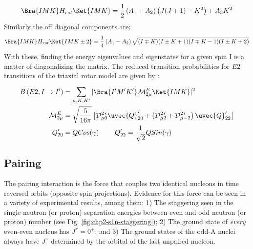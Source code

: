 \begin{equation}
\label{eqn:chp2-triaxial-diagonal-hamil}
\Bra{IMK}H_{rot}\Ket{IMK}=\frac{1}{2}\left(A_1+A_2\right)\left(J(J+1)-K^2\right) + A_3K^2
\end{equation}
Similarly the off diagonal components are:
\begin{equation}
\label{eqn:chp2-triaxial-offdiagonal-hamil}
\Bra{IMK}H_{rot}\Ket{IMK\pm{}2}=\frac{1}{4}\left(A_1-A_2\right)\sqrt{(I\mp{}K)(I\pm{}K+1)(I\mp{}K-1)(I\pm{}K+2)}
\end{equation}
With these, finding the energy eigenvalues and eigenstates for a given spin I is a matter of diagonalizing the matrix. The reduced transition probabilities for $E2$ transitions of the triaxial rotor model are given by \cite{wobblingGeometry}:
\begin{align}
\label{eqn:chp2-triaxial-rotor-reduced-transitions}
B\left(E2,I\rightarrow{}I'\right) &=\sum\limits_{\mu{},K,K'}^{}|\Bra{I'M'K'}\mathcal{M}^E_{2\mu}\Ket{IMK}|^2\\
\mathcal{M}^E_{2\mu} &= \sqrt{\frac{5}{16\pi}}\left[\mathcal{D}^{2*}_{\mu{}0}\uvec{Q}'_{20}+\left(\mathcal{D}^{2*}_{\mu{}2}+\mathcal{D}^{2*}_{\mu{}-2}\right)\uvec{Q}'_{22}\right] \nonumber\\
Q'_{20} &= Q Cos(\gamma) ~~~~~~~ Q'_{22} = \frac{1}{\sqrt{2}}Q Sin(\gamma) \nonumber
\end{align}

\subsection{Pairing}
\label{ssec:models-pairing}
The pairing interaction is the force that couples two identical nucleons in time reversed orbits (opposite spin projections). Evidence for this force can be seen in a variety of experimental results, among them: 1) The staggering seen in the single neutron (or proton) separation energies between even and odd neutron (or proton) number (see Fig. \ref{fig:chp2-s1n-staggering}); 2) The ground state of \emph{every} even-even nucleus has $J^{\pi}=0^+$; and 3) The ground states of the odd-A nuclei always have $J^{\pi}$ determined by the orbital of the last unpaired nucleon.

